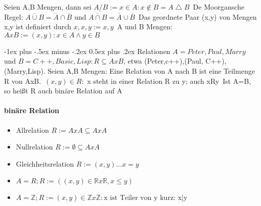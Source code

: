 \documentclass[a4paper]{article}
\makeatletter
\renewcommand{\section}{\@startsection{section}{1}{0mm}%
                                {-1ex plus -.5ex minus -.2ex}%
                                {0.5ex plus .2ex}%
                                {\normalfont\large\bfseries}}
\makeatother
\begin{document}
\begin{multicols}{3}
    Seien A,B Mengen, dann sei $A/B:={x\in A: x\not \in B } = A\bigtriangleup B$\
    De Moorgansche Regel: $\overline{A \cup B} = \overline{A} \cap \overline{B}$ und $\overline{A\cap B}=\overline{A}\cup \overline{B}$\
    Das geordnete Paar (x,y) von Mengen x,y ist definiert durch ${{x},{x,y}}:={x,y}$\
    A und B Mengen: $A x B:={(x,y):x\in A \wedge y \in B}$
    
    \section{Relationen}
    $A={Peter, Paul, Marry}$ und $B={C++, Basic, Lisp}: R\subseteq AxB$, etwa {(Peter,c++),(Paul, C++), (Marry,Lisp)}. Seien A,B Mengen: Eine Relation von A nach B ist eine Teilmenge R von AxB.\
    $(x,y)\in R:$ x steht in einer Relation R zu y; auch xRy\
    Ist A=B, so heißt R auch binäre Relation auf A
    
    \paragraph{binäre Relation}
    \begin{itemize}
        \item Allrelation $R:=AxA \subseteq AxA$
        \item Nullrelation $R:=\emptyset \subseteq AxA$
        \item Gleichheitsrelation $R:={(x,y)... x=y}$
        \item $A=R; R:=((x,y)\in \mathbb{R} x \mathbb{R}, x \leq y)$
        \item $A=\mathbb{Z}; R:={(x,y)\in \mathbb{Z} x \mathbb{Z}: \text{x ist Teiler von y} }$ kurz: x|y
    \end{itemize}
    

\end{multicols}
\end{document}
